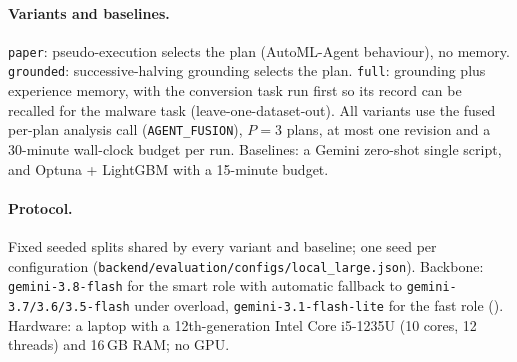 \paragraph{Variants and baselines.} \texttt{paper}: pseudo-execution selects the plan (AutoML-Agent behaviour), no memory. \texttt{grounded}: successive-halving grounding selects the plan. \texttt{full}: grounding plus experience memory, with the conversion task run first so its record can be recalled for the malware task (leave-one-dataset-out). All variants use the fused per-plan analysis call (\texttt{AGENT\_FUSION}), $P = 3$ plans, at most one revision and a 30-minute wall-clock budget per run. Baselines: a Gemini zero-shot single script, and Optuna + LightGBM with a 15-minute budget.

\paragraph{Protocol.} Fixed seeded splits shared by every variant and baseline; one seed per configuration (\texttt{backend/evaluation/configs/local\_large.json}). Backbone: \texttt{gemini-3.8-flash} for the smart role with automatic fallback to \texttt{gemini-3.7/3.6/3.5-flash} under overload, \texttt{gemini-3.1-flash-lite} for the fast role (). Hardware: a laptop with a 12th-generation Intel Core i5-1235U (10 cores, 12 threads) and 16\,GB RAM; no GPU.
